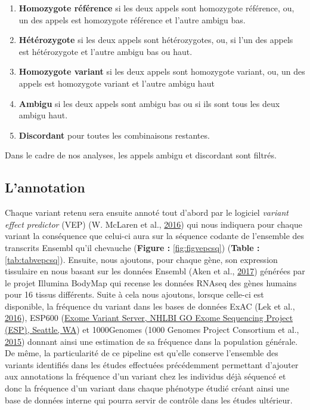 \documentclass[12pt,twoside]{reedthesis}
\providecommand{\tightlist}{%
  \setlength{\itemsep}{0pt}\setlength{\parskip}{0pt}}
\theoremstyle{definition}
\theoremstyle{definition}
\theoremstyle{remark}
\begin{document}
  \begin{enumerate}
  \def\labelenumi{\arabic{enumi}.}
  \tightlist
  \item
    \textbf{Homozygote référence} si les deux appels sont homozygote
    référence, ou, un des appels est homozygote référence et l'autre
    ambigu bas.
  \item
    \textbf{Hétérozygote} si les deux appels sont hétérozygotes, ou, si
    l'un des appels est hétérozygote et l'autre ambigu bas ou haut.\\
  \item
    \textbf{Homozygote variant} si les deux appels sont homozygote
    variant, ou, un des appels est homozygote variant et l'autre ambigu
    haut
  \item
    \textbf{Ambigu} si les deux appels sont ambigu bas ou si ils sont tous
    les deux ambigu haut.\\
  \item
    \textbf{Discordant} pour toutes les combinaisons restantes.
  \end{enumerate}
  
  Dans le cadre de nos analyses, les appels ambigu et discordant sont
  filtrés.
  
  \newpage
  
  \subsection{L'annotation}\label{lannotation}
  
  Chaque variant retenu sera ensuite annoté tout d'abord par le logiciel
  \emph{variant effect predictor} (VEP) (W. McLaren et al.,
  \protect\hyperlink{ref-McLaren2016}{2016}) qui nous indiquera pour
  chaque variant la conséquence que celui-ci aura sur la séquence codante
  de l'ensemble des transcrits Ensembl qu'il chevauche (\textbf{Figure :
  }\ref{fig:figvepcsq}) (\textbf{Table : }\ref{tab:tabvepcsq}). Ensuite,
  nous ajoutons, pour chaque gène, son expression tissulaire en nous
  basant sur les données Ensembl (Aken et al.,
  \protect\hyperlink{ref-Aken2017}{2017}) générées par le projet Illumina
  BodyMap qui recense les données RNAseq des gènes humains pour 16 tissus
  différents. Suite à cela nous ajoutons, lorsque celle-ci est disponible,
  la fréquence du variant dans les bases de données ExAC (Lek et al.,
  \protect\hyperlink{ref-Lek2016}{2016}), ESP600
  (\href{http://evs.gs.washington.edu/EVS/}{Exome Variant Server, NHLBI GO
  Exome Sequencing Project (ESP), Seattle, WA}) et 1000Genomes (1000
  Genomes Project Consortium et al.,
  \protect\hyperlink{ref-1000GenomesProjectConsortium2015}{2015}) donnant
  ainsi une estimation de sa fréquence dans la population générale. De
  même, la particularité de ce pipeline est qu'elle conserve l'ensemble
  des variants identifiés dans les études effectuées précédemment
  permettant d'ajouter aux annotations la fréquence d'un variant chez les
  individus déjà séquencé et donc la fréquence d'un variant dans chaque
  phénotype étudié créant ainsi une base de données interne qui pourra
  servir de contrôle dans les études ultérieur.
  
\end{document}
